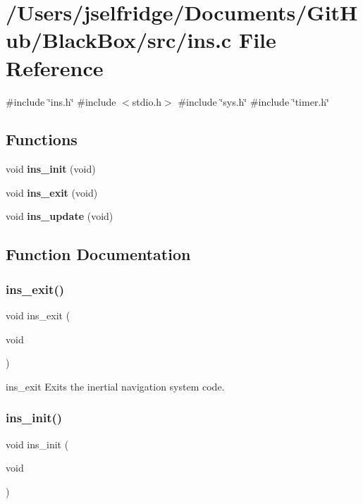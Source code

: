 \section{/\+Users/jselfridge/\+Documents/\+Git\+Hub/\+Black\+Box/src/ins.c File Reference}
\label{ins_8c}
{\ttfamily \#include \char`\"{}ins.\+h\char`\"{}}\newline
{\ttfamily \#include $<$stdio.\+h$>$}\newline
{\ttfamily \#include \char`\"{}sys.\+h\char`\"{}}\newline
{\ttfamily \#include \char`\"{}timer.\+h\char`\"{}}\newline
\subsection*{Functions}
\begin{DoxyCompactItemize}
\item 
void \textbf{ ins\+\_\+init} (void)
\item 
void \textbf{ ins\+\_\+exit} (void)
\item 
void \textbf{ ins\+\_\+update} (void)
\end{DoxyCompactItemize}


\subsection{Function Documentation}
\mbox{\label{ins_8c_ae333466ed9590c9a9d47a8d2d3fd7d74}} 
\subsubsection{ins\+\_\+exit()}
{\footnotesize\ttfamily void ins\+\_\+exit (\begin{DoxyParamCaption}\item[{void}]{ }\end{DoxyParamCaption})}

ins\+\_\+exit Exits the inertial navigation system code. \mbox{\label{ins_8c_abf3028c2ada542781b8a5e1eb20c17ce}} 
\subsubsection{ins\+\_\+init()}
{\footnotesize\ttfamily void ins\+\_\+init (\begin{DoxyParamCaption}\item[{void}]{ }\end{DoxyParamCaption})}

